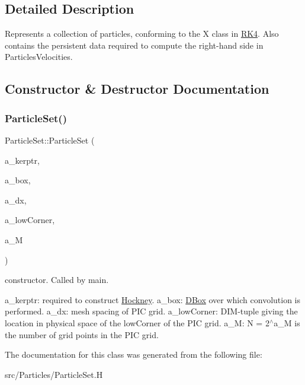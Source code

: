 \subsection{Detailed Description}
Represents a collection of particles, conforming to the X class in \hyperlink{class_r_k4}{R\+K4}. Also contains the persistent data required to compute the right-\/hand side in Particles\+Velocities. 

\subsection{Constructor \& Destructor Documentation}
\mbox{\label{class_particle_set_a3963fc6e57575ff7702b96fa2b5f1ccb}} 
\subsubsection{\texorpdfstring{Particle\+Set()}{ParticleSet()}}
{\footnotesize\ttfamily Particle\+Set\+::\+Particle\+Set (\begin{DoxyParamCaption}\item[{shared\+\_\+ptr$<$ \hyperlink{class_conv_kernel}{Conv\+Kernel} $>$ \&}]{a\+\_\+kerptr,  }\item[{\hyperlink{class_d_box}{D\+Box} \&}]{a\+\_\+box,  }\item[{double \&}]{a\+\_\+dx,  }\item[{array$<$ double, D\+IM $>$ \&}]{a\+\_\+low\+Corner,  }\item[{int}]{a\+\_\+M }\end{DoxyParamCaption})}



constructor. Called by main. 

a\+\_\+kerptr\+: required to construct \hyperlink{class_hockney}{Hockney}. a\+\_\+box\+: \hyperlink{class_d_box}{D\+Box} over which convolution is performed. a\+\_\+dx\+: mesh spacing of P\+IC grid. a\+\_\+low\+Corner\+: D\+I\+M-\/tuple giving the location in physical space of the low\+Corner of the P\+IC grid. a\+\_\+M\+: N = 2$^\wedge$a\+\_\+M is the number of grid points in the P\+IC grid. 

The documentation for this class was generated from the following file\+:\begin{DoxyCompactItemize}
\item 
src/\+Particles/Particle\+Set.\+H\end{DoxyCompactItemize}
